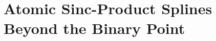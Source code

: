 \documentclass[11pt,oneside]{article}
\numberwithin{equation}{section}
\theoremstyle{definition}
\theoremstyle{remark}
\begin{document}
\part{Atomic Sinc-Product Splines Beyond the Binary Point}
\end{document}
